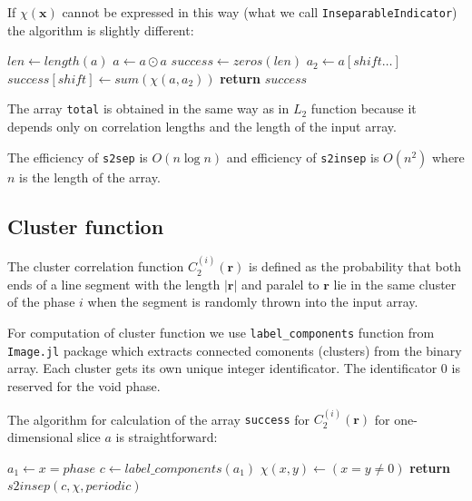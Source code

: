 \documentclass[reprint,amsmath,amssymb,aps,pre,showkeys,showpacs,nofootinbib]{revtex4-1}
\newcommand{\code}[1]{\colorbox{light-gray}{\texttt{#1}}}
\begin{document}
If $\chi(\bm{x})$ cannot be expressed in this way (what we call
\code{InseparableIndicator}) the algorithm is slightly different:
\begin{algorithmic}[1]
    \State $len \gets length(a)$
      \State $a \gets a \odot a$
    \EndIf
    \State $success \gets zeros(len)$
      \State $a_2 \gets a[shift \dots]$
      \State $success[shift] \gets sum(\chi(a, a_2))$
    \EndFor
    \State \textbf{return} $success$
  \EndProcedure
\end{algorithmic}

The array \code{total} is obtained in the same way as in $L_2$ function because
it depends only on correlation lengths and the length of the input array.

The efficiency of \code{s2sep} is $O(n\log n)$ and efficiency of
\code{s2insep} is $O(n^2)$ where $n$ is the length of the array.

\subsection{Cluster function}
The cluster correlation function $C_2^{(i)}(\bm{r})$ is defined as the
probability that both ends of a line segment with the length $|\bm{r}|$ and
paralel to $\bm{r}$ lie in the same cluster of the phase $i$ when the segment is
randomly thrown into the input array.

For computation of cluster function we use \code{label\_components} function
from \code{Image.jl} package which extracts connected comonents (clusters) from the
binary array. Each cluster gets its own unique integer identificator. The
identificator $0$ is reserved for the void phase.

The algorithm for calculation of the array \code{success} for
$C_2^{(i)}(\bm{r})$ for one-dimensional slice $a$ is straightforward:
\begin{algorithmic}[1]
  \State $a_1 \gets x = phase$ 
  \State $c \gets label\_components(a_1)$
  \State $\chi(x,y) \gets (x = y \ne 0)$
  \State \textbf{return} $s2insep(c, \chi, periodic)$
  \EndProcedure
\end{algorithmic}
\end{document}

